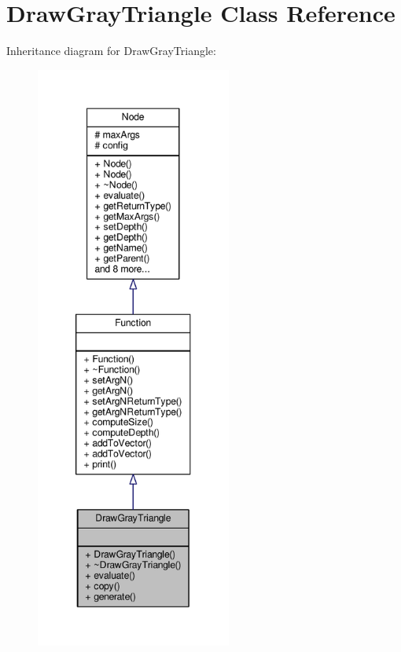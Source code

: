 \hypertarget{classDrawGrayTriangle}{}\section{Draw\+Gray\+Triangle Class Reference}
\label{classDrawGrayTriangle}


Inheritance diagram for Draw\+Gray\+Triangle\+:
\nopagebreak
\begin{figure}[H]
\begin{center}
\leavevmode
\includegraphics[height=550pt]{classDrawGrayTriangle__inherit__graph}
\end{center}
\end{figure}


